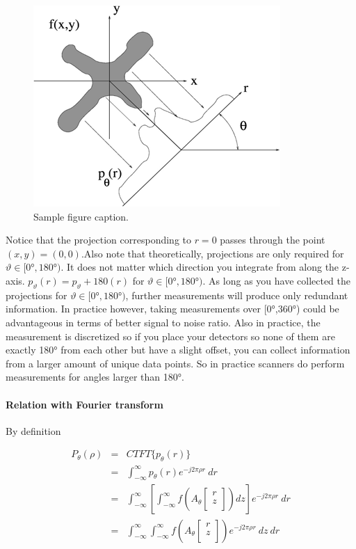 \documentclass{article}
\begin{document}
\begin{figure}
	\centering
	\includegraphics[width=0.7\linewidth]{NwQ7eeG.png}
	\caption{Sample figure caption.}
	\label{fig:NwQ7eeG}
\end{figure}

Notice that the projection corresponding to $r=0$ passes through the point $(x,y)=(0,0)$.Also note that theoretically, projections are only required for $\vartheta \in [0°, 180°)$. It does not matter which direction you integrate from along the z-axis. $p_\vartheta(r)=p_\vartheta+180(r)$ for $\vartheta \in [0°, 180°)$. As long as you have collected the projections for $\vartheta \in [0°, 180°)$, further measurements will produce only redundant information. In practice however, taking measurements over [0°,360°) could be advantageous in terms of better signal to noise ratio. Also in practice, the measurement is discretized so if you place your detectors so none of them are exactly 180° from each other but have a slight offset, you can collect information from a larger amount of unique data points. So in practice scanners do perform measurements for angles larger than 180°.\citep{projectrheaECE637Tomographic}

\paragraph{Relation with Fourier transform}

By definition


\begin{eqnarray}    \label{eq}
	{P_{\theta}(\rho)}&=&CTFT\{p_{\theta}(r)\}  \nonumber    \\
	~&=&\int_{-\infty}^{\infty}p_{\theta}(r)e^{-j2\pi\rho r}\ dr \nonumber    \\
	~&=&\int_{-\infty}^{\infty}[\int_{-\infty}^{\infty}f(A_{\theta}\begin{bmatrix}
		r \\
		z \\
	\end{bmatrix})dz]e^{-j2\pi\rho r}\ dr \nonumber    \\
	~&=&\int_{-\infty}^{\infty}\int_{-\infty}^{\infty}f(A_{\theta}\begin{bmatrix}
		r \\
		z \\
	\end{bmatrix})e^{-j2\pi\rho r}\ dz\ dr
\end{eqnarray}
\end{document}
